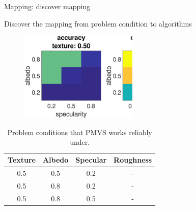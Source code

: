\documentclass[10pt]{beamer}
\begin{document}
\begin{frame}{Mapping: discover mapping}

Discover the mapping from problem condition to algorithms
\begin{figure}
\centering
\includegraphics[width=0.5\textwidth]{mapping/lookup_table/mvs_texture_05}
\end{figure}

\begin{table}
\centering
\begin{tabular}{*{4}{c}}
\toprule
Texture & Albedo & Specular & Roughness\\
\midrule
0.5 & 0.5 & 0.2 & -\\
0.5 & 0.8 & 0.2 & -\\
0.5 & 0.8 & 0.5 & -\\
\bottomrule
\end{tabular}
\caption{Problem conditions that PMVS works reliably under.}
\end{table}

\end{frame}

\end{document}
